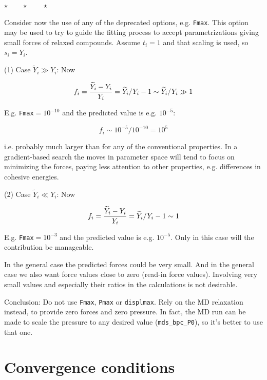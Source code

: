 \documentclass[a4paper,12pt,pdftex,onecolumn]{article}
\newcommand{\stars}{\begin{center}%
\vspace{1em plus 0.5em minus 0.5em}%
$\star \qquad \star \qquad \star$%
\vspace{1em plus 0.5em minus 0.5em}%
\end{center}}
\begin{document}
\stars

Consider now the use of any of the deprecated options, e.g. \verb+Fmax+.
This option may be used to try to guide the fitting process to accept
parametrizations giving small forces of relaxed compounds.
Assume $t_i=1$ and that scaling is used, so $s_i = Y_i$.

(1) Case $\widetilde{Y}_i \gg Y_i$: Now

\begin{equation}
f_i = {\widetilde{Y}_i - Y_i \over Y_i}
= \widetilde{Y}_i/Y_i - 1 \sim \widetilde{Y}_i/Y_i \gg 1
\end{equation}

E.g. \verb+Fmax+$ = 10^{-10}$ and the predicted value is e.g. $10^{-5}$:

\begin{equation}
f_i \sim 10^{-5} / 10^{-10} = 10^5
\end{equation}

i.e. probably much larger than for any of the conventional properties.
In a gradient-based search the moves in parameter space will tend to focus
on minimizing the forces, paying less attention to other properties,
e.g. differences in cohesive energies.

(2) Case $\widetilde{Y}_i \ll Y_i$: Now

\begin{equation}
f_i = {\widetilde{Y}_i - Y_i \over Y_i}
= \widetilde{Y}_i/Y_i - 1 \sim 1
\end{equation}

E.g. \verb+Fmax+$ = 10^{-3}$ and the predicted value is e.g. $10^{-5}$.
Only in this case will the contribution be manageable.

In the general case the predicted forces could be very small. And in
the general case we also want force values close to zero (read-in force
values). Involving very small values and especially their ratios in the
calculations is not desirable.

Conclusion: Do not use \verb+Fmax+, \verb+Pmax+ or \verb+displmax+. Rely on the
MD relaxation instead, to provide zero forces and zero pressure.
In fact, the MD run can be made to scale the pressure to any desired
value (\verb+mds_bpc_P0+), so it's better to use that one.








\section{Convergence conditions}
\end{document}
